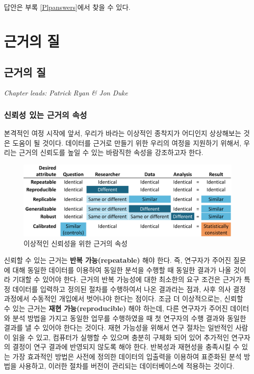 \documentclass[10.5pt]{book}
\theoremstyle{definition}
\theoremstyle{definition}
\theoremstyle{definition}
\theoremstyle{remark}
\begin{document}
답안은 부록 \ref{Plpanswers}에서 찾을 수 있다.

\part{근거의 질}\label{part--}

\chapter{근거의 질}\label{EvidenceQuality}

\emph{Chapter leads: Patrick Ryan \& Jon Duke}


\section{신뢰성 있는 근거의 속성}\label{---}

본격적인 여정 시작에 앞서, 우리가 바라는 이상적인 종착지가 어디인지
상상해보는 것은 도움이 될 것이다. 데이터를 근거로 만들기 위한 우리의
여정을 지원하기 위해서, 우리는 근거의 신뢰도를 높일 수 있는 바람직한
속성을 강조하고자 한다.

\begin{figure}

{\centering \includegraphics[width=1\linewidth]{images/EvidenceQuality/reliableevidenceattributes} 

}

\caption{이상적인 신뢰성을 위한 근거의 속성}\label{fig:attributesOfEvidence}
\end{figure}

신뢰할 수 있는 근거는 \textbf{반복 가능(repeatable)} 해야 한다. 즉,
연구자가 주어진 질문에 대해 동일한 데이터를 이용하여 동일한 분석을
수행할 때 동일한 결과가 나올 것이라 기대할 수 있어야 한다. 근거의 반복
가능성에 대한 최소한의 요구 조건은 근거가 특정 데이터를 입력하고 정의된
절차를 수행하여서 나온 결과라는 점과, 사후 의사 결정 과정에서 수동적인
개입에서 벗어나야 한다는 점이다. 조금 더 이상적으로는, 신뢰할 수 있는
근거는 \textbf{재현 가능(reproducible)} 해야 하는데, 다른 연구자가
주어진 데이터와 분석 방법을 가지고 동일한 업무를 수행하였을 때 첫
연구자의 수행 결과와 동일한 결과를 낼 수 있어야 한다는 것이다. 재현
가능성을 위해서 연구 절차는 일반적인 사람이 읽을 수 있고, 컴퓨터가
실행할 수 있으며 충분히 구체화 되어 있어 추가적인 연구자의 결정이 연구
결과에 반영되지 않도록 해야 한다. 반복성과 재현성을 충족시킬 수 있는
가장 효과적인 방법은 사전에 정의한 데이터의 입출력을 이용하여 표준화된
분석 방법을 사용하고, 이러한 절차를 버전이 관리되는 데이터베이스에
적용하는 것이다.
\end{document}
